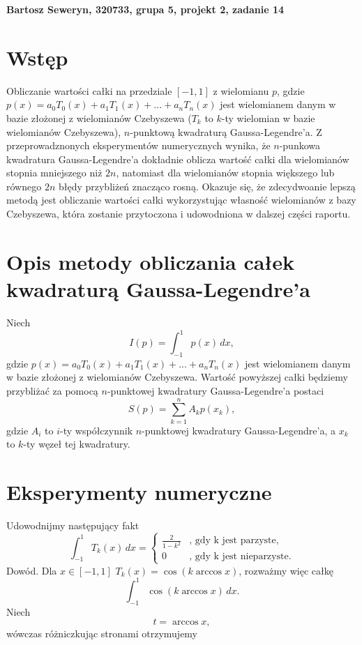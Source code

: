 \documentclass[a4paper,12pt]{article}
\begin{document}
\def\tablename{Tabela} %


\noindent
\textbf{Bartosz Seweryn, 320733, grupa 5, projekt 2, zadanie 14}


\section*{Wstęp}
Obliczanie wartości całki na przedziale $[-1, 1]$ z wielomianu $p$, gdzie $p(x) = a_0T_0(x) + a_1T_1(x) + ... + a_nT_n(x)$ jest wielomianem danym w bazie złożonej z wielomianów Czebyszewa ($T_k$ to $k$-ty wielomian w bazie wielomianów Czebyszewa), $n$-punktową kwadraturą Gaussa-Legendre'a. Z przeprowadznonych eksperymentów numerycznych wynika, że $n$-punkowa kwadratura Gaussa-Legendre'a dokładnie oblicza wartość całki dla wielomianów stopnia mniejszego niż $2n$, natomiast dla wielomianów stopnia większego lub równego $2n$ błędy przybliżeń znacząco rosną. Okazuje się, że zdecydwoanie lepszą metodą jest obliczanie wartości całki wykorzystując własność wielomianów z bazy Czebyszewa, która zostanie przytoczona i udowodniona w dalszej części raportu.


\section*{Opis metody obliczania całek kwadraturą Gaussa-Legendre'a}
Niech 
\[
I(p) = \int_{-1}^{1}p(x)\,dx,
\]
gdzie $p(x) = a_0T_0(x) + a_1T_1(x) + ... + a_nT_n(x)$ jest wielomianem danym w bazie złożonej z wielomianów Czebyszewa. Wartość powyższej całki będziemy przybliżać za pomocą $n$-punktowej kwadratury Gaussa-Legendre'a postaci
\[
S(p) = \sum_{k = 1}^{n}A_kp(x_k),
\]
gdzie $A_i$ to $i$-ty współczynnik $n$-punktowej kwadratury Gaussa-Legendre'a, a $x_k$ to $k$-ty węzeł tej kwadratury.
\section*{Eksperymenty numeryczne}
Udowodnijmy następujący fakt
\[
\int_{-1}^{1}T_{k}(x)\,dx =
\begin{cases}
\frac{2}{1 - k^2} & \text{, gdy k jest parzyste,}\\
0 & \text{, gdy k jest nieparzyste.}
\end{cases}
\]
Dowód. Dla $x \in [-1, 1]$ $T_k(x) = \cos{(k\arccos{x})}$, rozważmy więc całkę
\begin{equation} \label{eq:1}
\int_{-1}^{1} \cos{(k\arccos{x})}\,dx.
\end{equation}
Niech 
\begin{equation} \label{eq:2}
t = \arccos{x},
\end{equation}
wówczas różniczkując stronami otrzymujemy 
\end{document}
